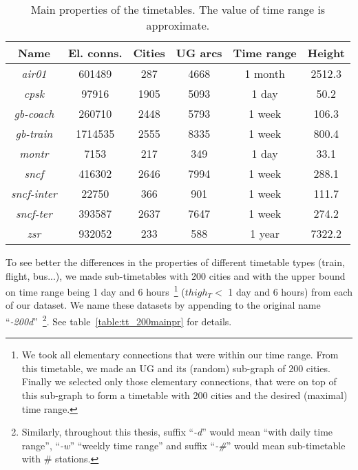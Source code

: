 	\begin{table}[h!]
		\centering
		\small
		\begin{tabular}{c|c|c|c|c|c}
			\rowcolor{tablehead}
			\textbf{Name} & \textbf{El. conns.} & \textbf{Cities} & \textbf{UG arcs} & \textbf{Time range} & \textbf{Height} \\
			\hline
			\textit{air01} & 601489 & 287 & 4668 & 1 month & 2512.3 \\
			\textit{cpsk} & 97916 & 1905 & 5093 & 1 day & 50.2 \\
			\textit{gb-coach} & 260710 & 2448 & 5793 & 1 week & 106.3 \\
			\textit{gb-train} & 1714535 & 2555 & 8335 & 1 week & 800.4 \\
			\textit{montr} & 7153 & 217 & 349  & 1 day & 33.1 \\
			\textit{sncf} & 416302 & 2646 & 7994 & 1 week & 288.1 \\
			\textit{sncf-inter} & 22750 & 366 & 901 & 1 week & 111.7 \\
			\textit{sncf-ter} & 393587 & 2637 & 7647 & 1 week & 274.2 \\
			\textit{zsr} & 932052 & 233 & 588 & 1 year & 7322.2 \\
		\end{tabular}
		\caption{\label{table:tt_mainpr} Main properties of the timetables. The value of time range is approximate.}
		\normalsize
	\end{table}	
	
	\noindent To see better the differences in the properties of different timetable types (train, flight, bus...), we made sub-timetables with 200 cities and with the upper bound on time range being 1 day and 6 hours~\footnote{We took all elementary connections that were within our time range. From this timetable, we made an UG and its (random) sub-graph of 200 cities. Finally we selected only those elementary connections, that were on top of this sub-graph to form a timetable with 200 cities and the desired (maximal) time range.} ($thigh_{T} <$ 1 day and 6 hours) from each of our dataset. We name these datasets by appending to the original name ``\textit{-200d}''~\footnote{Similarly, throughout this thesis, suffix ``\textit{-d}'' would mean ``with daily time range'', ``\textit{-w}'' ``weekly time range'' and suffix ``\textit{-\#}'' would mean sub-timetable with \# stations.}. See table~\ref{table:tt_200mainpr} for details. \\
	
